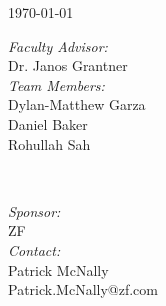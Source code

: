 \documentclass[12pt]{article}
\begin{document}
\begin{titlepage}
    {\large \today}\\[1cm] 
    
    
    \begin{minipage}{0.4\textwidth}
        \begin{flushleft} \large
            \emph{Faculty Advisor:}\\
            Dr. Janos Grantner\\ [.25cm]
        \emph{Team Members:}\\
        Dylan-Matthew Garza\\
        Daniel Baker\\
        Rohullah Sah
        \end{flushleft}
    \end{minipage}
    ~
    \begin{minipage}{0.4\textwidth}
        \begin{flushright} \large
            \emph{Sponsor:} \\
            ZF
            \\\emph{Contact:}\\
            Patrick McNally\\ 
            Patrick.McNally@zf.com
        \end{flushright}
    \end{minipage}\\[1cm]
    
    
    \begin{flushleft} \large
    \end{flushleft}
    
    \vfill 
    
\end{titlepage}

\tableofcontents
\newpage
\end{document}
